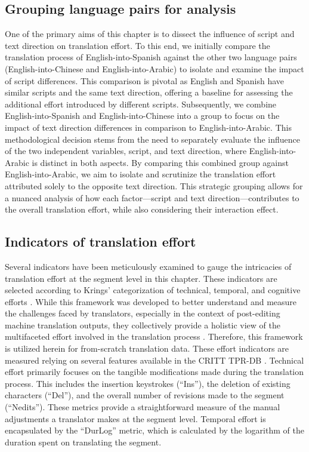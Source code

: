 \documentclass[output=paper]{langscibook}
\begin{document}
\subsection{Grouping language pairs for analysis}

One of the primary aims of this chapter is to dissect the influence of script and text direction on translation effort. To this end, we initially compare the translation process of English-into-Spanish against the other two language pairs (English-into-Chinese and English-into-Arabic) to isolate and examine the impact of script differences. This comparison is pivotal as English and Spanish have similar scripts and the same text direction, offering a baseline for assessing the additional effort introduced by different scripts. Subsequently, we combine English-into-Spanish and English-into-Chinese into a group to focus on the impact of text direction differences in comparison to English-into-Arabic. This methodological decision stems from the need to separately evaluate the influence of the two independent variables, script, and text direction, where English-into-Arabic is distinct in both aspects. By comparing this combined group against English-into-Arabic, we aim to isolate and scrutinize the translation effort attributed solely to the opposite text direction. This strategic grouping allows for a nuanced analysis of how each factor—script and text direction—contributes to the overall translation effort, while also considering their interaction effect.

\subsection{Indicators of translation effort}

Several indicators have been meticulously examined to gauge the intricacies of translation effort at the segment level in this chapter. These indicators are selected according to Krings’ categorization of technical, temporal, and cognitive efforts \citep{krings_repairing_2001}. While this framework was developed to better understand and measure the challenges faced by translators, especially in the context of post-editing machine translation outputs, they collectively provide a holistic view of the multifaceted effort involved in the translation process \citep{CarlEtAl2022}. Therefore, this framework is utilized herein for from-scratch translation data. These effort indicators are measured relying on several features available in the CRITT TPR-DB \citep{CarlEtAl2016}. Technical effort primarily focuses on the tangible modifications made during the translation process. This includes the insertion keystrokes (“Ins”), the deletion of existing characters (“Del”), and the overall number of revisions made to the segment (“Nedits”). These metrics provide a straightforward measure of the manual adjustments a translator makes at the segment level. Temporal effort is encapsulated by the “DurLog” metric, which is calculated by the logarithm of the duration spent on translating the segment.
\end{document}
